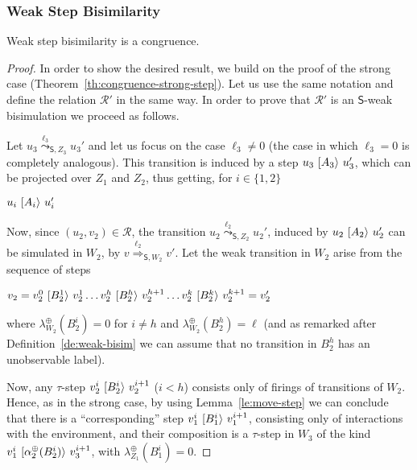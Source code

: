 \documentclass{LMCS}
\newcommand{\monSub}[2]{\ensuremath{{#1}_{#2}^\oplus}}
\newcommand{\trans}[1]{\ensuremath{\ [\/{#1}\/\rangle}\ }
\newcommand{\wltr}[3][x]{\ensuremath{\stackrel{{#3}}{\leadsto}_{\mathsf{#1},#2}}}
\newcommand{\Ltr}[3][x]{\ensuremath{\stackrel{{#3}}{\Longrightarrow}_{\mathsf{#1},#2}}}
\begin{document}
\subsubsection{Weak Step Bisimilarity}

\begin{thm}
  \label{th:congruence-weak-step}
  Weak step bisimilarity is a congruence.
\end{thm}


\begin{proof}
  In order to show the desired result, we build on the proof of the
  strong case (Theorem~\ref{th:congruence-strong-step}).
Let us use the same notation and define the relation $\mathcal{R}'$ in the
  same way. In order to prove that $\mathcal{R}'$ is an
  $\mathsf{S}$-weak bisimulation we proceed as follows.


  Let $u_3 \wltr[S]{Z_3}{\ell_3} u_3'$ and let us focus on the case
  $\ell_3 \neq 0$ (the case in which $\ell_3 = 0$ is completely
  analogous). This transition is induced by a step $u_3 \trans{A_3}
  u_3'$, which can be projected over $Z_1$ and $Z_2$, thus getting,
  for $i \in \{ 1, 2\}$
  \begin{center}
    $u_i \trans{A_i} u_i'$
  \end{center}
  Now, since $(u_2,v_2) \in \mathcal{R}$, the transition $u_2
  \wltr[S]{Z_2}{\ell_2} u_2'$, induced by $u_2 \trans{A_2} u_2'$ can
  be simulated in $W_2$, by $v \Ltr[S]{W_2}{\ell_2} v'$.  Let the weak
  transition in $W_2$ arise from the sequence of steps
  \begin{center}
    $v_2 = v_2^0 \trans{B_2^1} v_2^1 \ldots v_2^{h} \trans{B_2^h} v_2^{h+1}  \ldots v_2^k \trans{B_2^k} v_2^{k+1} = v_2'$
  \end{center}
  where $\monSub{\lambda}{{W_2}}(B_2^i) = 0$ for $i \neq h$ and
  $\monSub{\lambda}{{W_2}}(B_2^h) = \ell$ (and as remarked after
  Definition~\ref{de:weak-bisim} we can assume that no transition in
  $B_2^h$ has an unobservable label).

  Now, any $\tau$-step $v_2^i \trans{B_2^i} v_2^{i+1}$ ($i < h$)
  consists only of firings of transitions of $W_2$. Hence, as in the
  strong case, by using Lemma~\ref{le:move-step} we can conclude that
  there is a ``corresponding'' step $v_1^i \trans{B_1^{i}} v_1^{i+1}$,
  consisting only of interactions with the environment, and their
  composition is a $\tau$-step in $W_3$ of the kind $v_1^i
  \trans{\monSub{\alpha}{2}(B_2^{i})} v_3^{i+1}$, with
  $\monSub{\lambda}{{Z_1}}(B_1^i) = 0$.


\end{proof}
\end{document}
